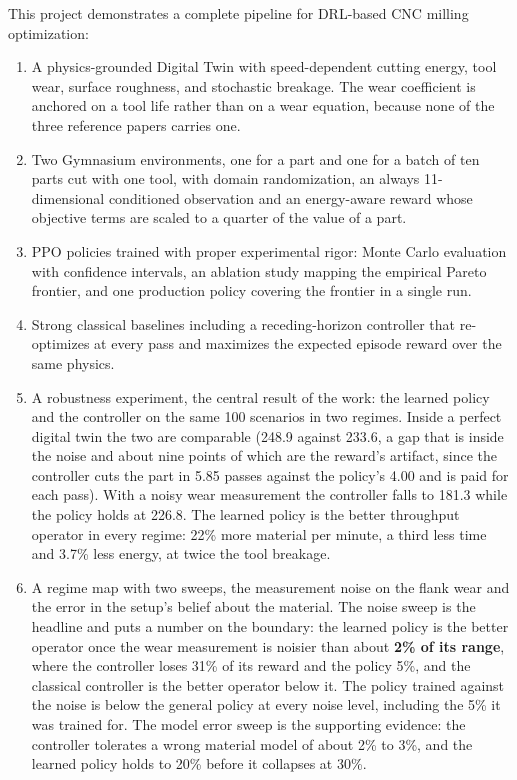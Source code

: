 \documentclass[11pt,a4paper]{article}
\newcommand{\alert}[1]{\textcolor{IITGold}{\textbf{#1}}}
\begin{document}
This project demonstrates a complete pipeline for DRL-based CNC milling optimization:
\begin{enumerate}
    \item A physics-grounded Digital Twin with speed-dependent cutting energy, tool wear, surface roughness, and stochastic breakage. The wear coefficient is anchored on a tool life rather than on a wear equation, because none of the three reference papers carries one.
    \item Two Gymnasium environments, one for a part and one for a batch of ten parts cut with one tool, with domain randomization, an always 11-dimensional conditioned observation and an energy-aware reward whose objective terms are scaled to a quarter of the value of a part.
    \item PPO policies trained with proper experimental rigor: Monte Carlo evaluation with confidence intervals, an ablation study mapping the empirical Pareto frontier, and one production policy covering the frontier in a single run.
    \item Strong classical baselines including a receding-horizon controller that re-optimizes at every pass and maximizes the expected episode reward over the same physics.
    \item A robustness experiment, the central result of the work: the learned policy and the controller on the same 100 scenarios in two regimes. Inside a perfect digital twin the two are comparable (248.9 against 233.6, a gap that is inside the noise and about nine points of which are the reward's artifact, since the controller cuts the part in 5.85 passes against the policy's 4.00 and is paid for each pass). With a noisy wear measurement the controller falls to 181.3 while the policy holds at 226.8. The learned policy is the better throughput operator in every regime: 22\% more material per minute, a third less time and 3.7\% less energy, at twice the tool breakage.
    \item A regime map with two sweeps, the measurement noise on the flank wear and the error in the setup's belief about the material. The noise sweep is the headline and puts a number on the boundary: the learned policy is the better operator once the wear measurement is noisier than about \alert{2\% of its range}, where the controller loses 31\% of its reward and the policy 5\%, and the classical controller is the better operator below it. The policy trained against the noise is below the general policy at every noise level, including the 5\% it was trained for. The model error sweep is the supporting evidence: the controller tolerates a wrong material model of about 2\% to 3\%, and the learned policy holds to 20\% before it collapses at 30\%.

\end{enumerate}
\end{document}
